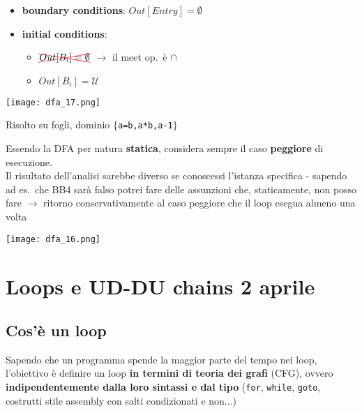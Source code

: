 \noindent\begin{minipage}[c]{.5\textwidth}
\begin{itemize}
  \item \textbf{boundary conditions}: $Out[Entry] = \emptyset$
  \item \textbf{initial conditions}:
    \begin{itemize}
      \item $\textcolor{red}{\xcancel{\textcolor{black}{Out[B_{i}] = \emptyset}}}$ $\rightarrow$ il meet op.~\`e $\cap$
      \item $Out[B_{i}] = \mathcal{U}$
    \end{itemize}
\end{itemize}
\end{minipage}\hfill
\begin{minipage}[c]{.4\textwidth}
\texttt{[image: dfa\_17.png]}
\end{minipage}

\begin{example}
\noindent\begin{minipage}[c]{.65\textwidth}
  Risolto su fogli, dominio $\lbrace$\lstinline|a=b,a*b,a-1|$\rbrace$
\begin{emphasize}
  Essendo la DFA per natura \textbf{statica}, considera sempre il caso \textbf{peggiore} di esecuzione.\\
  Il risultato dell'analisi sarebbe diverso se conoscessi l'istanza specifica - sapendo ad es.~che BB4 sar\`a falso potrei fare delle assunzioni che, staticamente, non posso fare $\rightarrow$ ritorno conservativamente al caso peggiore che il loop esegua almeno una volta
\end{emphasize}
\end{minipage}\hfill
\begin{minipage}[c]{.3\textwidth}
\texttt{[image: dfa\_16.png]}
\end{minipage}
\end{example}

\section{Loops e UD-DU chains 2 aprile}

\subsection{Cos'\`e un loop}

Sapendo che un programma spende la maggior parte del tempo nei loop, l'obiettivo \`e definire un loop \textbf{in termini di teoria dei grafi} (CFG), ovvero \textbf{indipendentemente dalla loro sintassi e dal tipo} (\lstinline|for|, \lstinline|while|, \lstinline|goto|, costrutti stile assembly con salti condizionati e non...)

